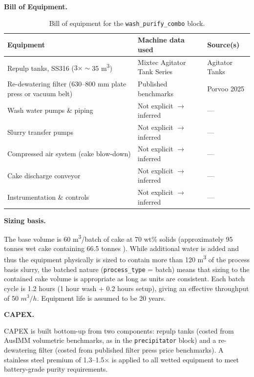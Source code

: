 \medskip
\noindent\textbf{Bill of Equipment.}\quad

\begin{table}[h!]
\caption{Bill of equipment for the \texttt{wash\_purify\_combo} block.}
\centering
\begin{tabular}{>{\raggedright\arraybackslash}p{5.2cm}
				>{\raggedright\arraybackslash}p{4cm}
				>{\raggedright\arraybackslash}p{4.5cm}}
\toprule
\textbf{Equipment} & \textbf{Machine data used} & \textbf{Source(s)} \\
\midrule
Repulp tanks, SS316 ($3 \times \sim$35 \si{m^3}) & Mixtec Agitator Tank Series & Agitator Tanks \\
Re-dewatering filter (630--800 mm plate press or vacuum belt) & Published benchmarks & Porvoo 2025 \\
Wash water pumps \& piping & Not explicit $\rightarrow$ inferred & --- \\
Slurry transfer pumps & Not explicit $\rightarrow$ inferred & --- \\
Compressed air system (cake blow-down) & Not explicit $\rightarrow$ inferred & --- \\
Cake discharge conveyor & Not explicit $\rightarrow$ inferred & --- \\
Instrumentation \& controls & Not explicit $\rightarrow$ inferred & --- \\
\bottomrule
\end{tabular}
\end{table}

\medskip
\noindent\textbf{Sizing basis.}\quad

The base volume is 60 \si{m^3}/batch of  cake at 70 wt\% solids (approximately 95 tonnes wet cake containing 66.5 tonnes ). While additional water is added and thus the equipment physically is sized to contain more than 120 \si{m^3} of the process basis slurry, the batched nature (\texttt{process\_type} = batch) means that sizing to the contained cake volume is appropriate as long as units are consistent. Each batch cycle is 1.2 hours (1 hour wash + 0.2 hours setup), giving an effective throughput of 50 $\si{m^3/h}$. Equipment life is assumed to be 20 years.

\medskip
\noindent\textbf{CAPEX.}\quad

CAPEX is built bottom-up from two components: repulp tanks (costed from AusIMM volumetric benchmarks, as in the \texttt{precipitator} block) and a re-dewatering filter (costed from published filter press price benchmarks). A stainless steel premium of 1.3--1.5$\times$ is applied to all wetted equipment to meet battery-grade  purity requirements.

